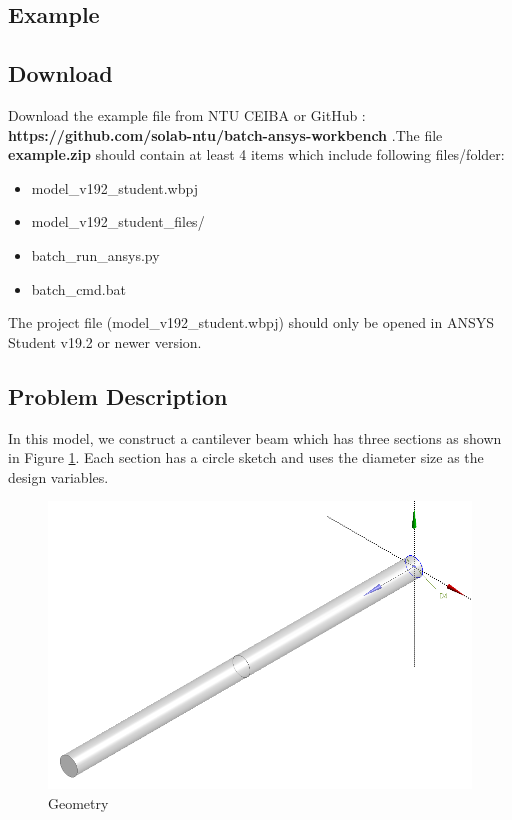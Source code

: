 \documentclass[12pt]{kjleehw}
\begin{document}
\begin{CJK}{UTF8}{bkai}
\section{Example}

\subsection{Download}

Download the example file from NTU CEIBA or GitHub :
\textbf{https://github.com/solab-ntu/batch-ansys-workbench} .The file \textbf{example.zip} should contain at least 4 items which include following files/folder:

\begin{itemize}
  \item model\_v192\_student.wbpj
  \item model\_v192\_student\_files/
  \item batch\_run\_ansys.py
  \item batch\_cmd.bat
\end{itemize}

The project file (model\_v192\_student.wbpj) should only be opened in ANSYS Student v19.2 or newer version.

\subsection{Problem Description}

In this model, we construct a cantilever beam which has three sections as shown in Figure \ref{fig:cantilever}. Each section has a circle sketch and uses the diameter size as the design variables.\\

\begin{figure}[h]
	\centering
	\includegraphics[scale=0.4]{figure/cantilever.png}
	\caption{Geometry}
	\label{fig:cantilever}
\end{figure}


\end{CJK}
\end{document}
